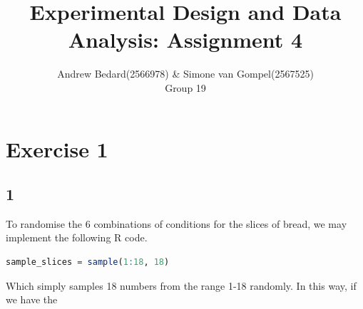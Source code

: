 \documentclass{article}
\title{Experimental Design and Data Analysis: Assignment 4}
\author{Andrew Bedard(2566978) \& Simone van Gompel(2567525) \\ Group 19}
\begin{document}
  \maketitle

  \section*{Exercise 1}
    \subsection*{1}
    To randomise the 6 combinations of conditions for the slices of bread, we may implement the following R code.
      \begin{lstlisting}[language=R]
      sample_slices = sample(1:18, 18)
      \end{lstlisting}
Which simply samples 18 numbers from the range 1-18 randomly. In this way, if we have the 
\end{document}
